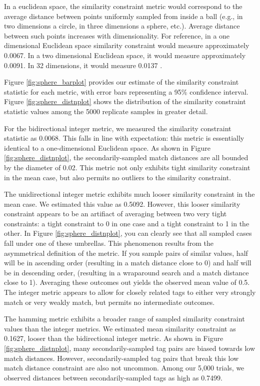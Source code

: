 

In a euclidean space, the similarity constraint metric would correspond to the average distance between points uniformly sampled from inside a ball (e.g., in two dimensions a circle, in three dimensions a sphere, etc.).
Average distance between such points increases with dimensionality.
For reference, in a one dimensional Euclidean space similarity constraint would measure approximately 0.0067.
In a two dimensional Euclidean space, it would measure approximately  0.0091.
In 32 dimensions, it would measure 0.0137 \citep{dunbar1997average}.

Figure \ref{fig:sphere_barplot} provides our estimate of the similarity constraint statistic for each metric, with error bars representing a 95\% confidence interval.
Figure \ref{fig:sphere_distnplot} shows the distribution of the similarity constraint statistic values among the 5000 replicate samples in greater detail.

For the bidirectional integer metric, we measured the similarity constraint statistic as 0.0068.
This falls in line with expectation: this metric is essentially identical to a one-dimensional Euclidean space.
As shown in Figure \ref{fig:sphere_distnplot}, the secondarily-sampled match distances are all bounded by the diameter of 0.02.
This metric not only exhibits tight similarity constraint in the mean case, but also permits no outliers to the similarity constraint.

The unidirectional integer metric exhibits much looser similarity constraint in the mean case.
We estimated this value as 0.5092.
However, this looser similarity constraint appears to be an artifiact of averaging between two very tight constraints: a tight constraint to 0 in one case and a tight constraint to 1 in the other.
In Figure \ref{fig:sphere_distnplot}, you can clearly see that all sampled cases fall under one of these umbrellas.
This phenomenon results from the asymmetrical definition of the metric.
If you sample pairs of similar values, half will be in ascending order (resulting in a match distance close to 0) and half will be in descending order, (resulting in a wraparound search and a match distance close to 1).
Averaging these outcomes out yields the observed mean value of 0.5.
The integer metric appears to allow for closely related tags to either very strongly match or very weakly match, but permits no intermediate outcomes.

The hamming metric exhibits a broader range of sampled similarity constraint values than the integer metrics.
We estimated mean similarity constraint as 0.1627, looser than the bidirectional integer metric.
As shown in Figure \ref{fig:sphere_distnplot}, many secondarily-sampled tag pairs are biased towards low match distances.
However, secondarily-sampled tag pairs that break this low match distance constraint are also not uncommon.
Among our 5,000 trials, we observed distances between secondarily-sampled tags as high as 0.7499.

